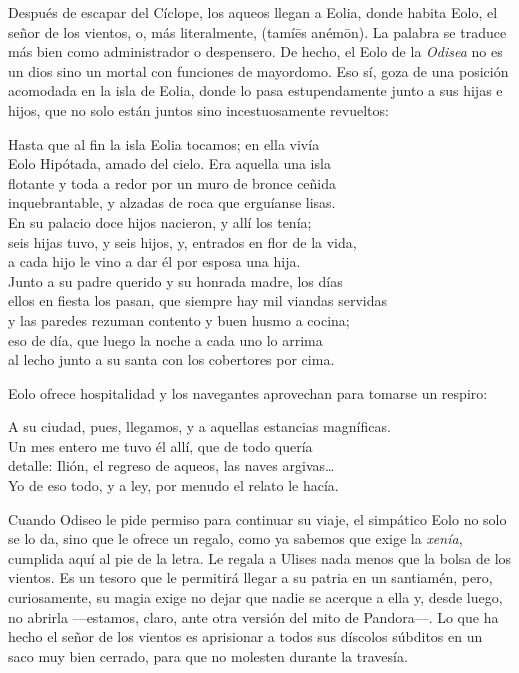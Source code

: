 \label{cap:eolo}

Después de escapar del Cíclope, los aqueos llegan a Eolia, donde habita Eolo, el señor de los vientos, o, más literalmente,  (tamíēs anémōn). La palabra  se traduce más bien como administrador o despensero. De hecho, el Eolo de la \emph{Odisea} no es un dios sino un mortal con funciones de mayordomo. Eso sí, goza de una posición acomodada en la isla de Eolia, donde lo pasa estupendamente junto a sus hijas e hijos, que no solo están juntos sino incestuosamente revueltos:

\begin{versocita}
Hasta que al fin la isla Eolia tocamos; en ella vivía\\
Eolo Hipótada, amado del cielo. Era aquella una isla\\
flotante y toda a redor por un muro de bronce ceñida\\
inquebrantable, y alzadas de roca que erguíanse lisas.\\
En su palacio doce hijos nacieron, y allí los tenía;\\
seis hijas tuvo, y seis hijos, y, entrados en flor de la vida,\\
a cada hijo le vino a dar él por esposa una hija.\\
Junto a su padre querido y su honrada madre, los días\\
ellos en fiesta los pasan, que siempre hay mil viandas servidas\\
y las paredes rezuman contento y buen husmo a cocina;\\
eso de día, que luego la noche a cada uno lo arrima\\
al lecho junto a su santa con los cobertores por cima.
\end{versocita}

Eolo ofrece hospitalidad y los navegantes aprovechan para tomarse un respiro:

\begin{versocita}
A su ciudad, pues, llegamos, y a aquellas estancias magníficas.\\
Un mes entero me tuvo él allí, que de todo quería\\
detalle: Ilión, el regreso de aqueos, las naves argivas…\\
Yo de eso todo, y a ley, por menudo el relato le hacía.
\end{versocita}

Cuando Odiseo le pide permiso para continuar su viaje, el simpático Eolo no solo se lo da, sino que le ofrece un regalo, como ya sabemos que exige la \emph{xenía}, cumplida aquí al pie de la letra. Le regala a Ulises nada menos que la bolsa de los vientos. Es un tesoro que le permitirá llegar a su patria en un santiamén, pero, curiosamente, su magia exige no dejar que nadie se acerque a ella y, desde luego, no abrirla ---estamos, claro, ante otra versión del mito de Pandora---. Lo que ha hecho el señor de los vientos es aprisionar a todos sus díscolos súbditos en un saco muy bien cerrado, para que no molesten durante la travesía.


